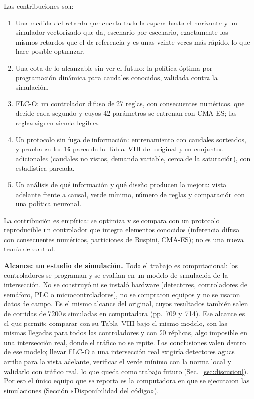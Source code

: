 \documentclass[journal]{IEEEtran}
\newcommand{\FLC}{FLC-O}
\begin{document}
Las contribuciones son:
\begin{enumerate}
\item Una medida del retardo que cuenta toda la espera hasta el horizonte y un simulador vectorizado que da, escenario por escenario, exactamente los mismos retardos que el de referencia y es unas veinte veces más rápido, lo que hace posible optimizar.
\item Una cota de lo alcanzable sin ver el futuro: la política óptima por programación dinámica para caudales conocidos, validada contra la simulación.
\item \FLC{}: un controlador difuso de 27 reglas, con consecuentes numéricos, que decide cada segundo y cuyos 42 parámetros se entrenan con CMA-ES; las reglas siguen siendo legibles.
\item Un protocolo sin fuga de información: entrenamiento con caudales sorteados, y prueba en los 16 pares de la Tabla~VIII del original y en conjuntos adicionales (caudales no vistos, demanda variable, cerca de la saturación), con estadística pareada.
\item Un análisis de qué información y qué diseño producen la mejora: vista adelante frente a causal, verde mínimo, número de reglas y comparación con una política neuronal.
\end{enumerate}

La contribución es empírica: se optimiza y se compara con un protocolo reproducible un controlador que integra elementos conocidos (inferencia difusa con consecuentes numéricos, particiones de Ruspini, CMA-ES); no es una nueva teoría de control.

\textbf{Alcance: un estudio de simulación.} Todo el trabajo es computacional: los controladores se programan y se evalúan en un modelo de simulación de la intersección. No se construyó ni se instaló hardware (detectores, controladores de semáforo, PLC o microcontroladores), no se compraron equipos y no se usaron datos de campo. Es el mismo alcance del original, cuyos resultados también salen de corridas de 7200\,s simuladas en computadora (pp.~709 y~714). Ese alcance es el que permite comparar con su Tabla~VIII bajo el mismo modelo, con las mismas llegadas para todos los controladores y con 20 réplicas, algo imposible en una intersección real, donde el tráfico no se repite. Las conclusiones valen dentro de ese modelo; llevar \FLC{} a una intersección real exigiría detectores aguas arriba para la vista adelante, verificar el verde mínimo con la norma local y validarlo con tráfico real, lo que queda como trabajo futuro (Sec.~\ref{sec:discusion}). Por eso el único equipo que se reporta es la computadora en que se ejecutaron las simulaciones (Sección «Disponibilidad del código»).
\end{document}
